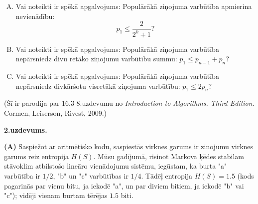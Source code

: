 \documentclass[a4paper]{article}
\begin{document}
\begin{enumerate}[(A)]
\item Vai noteikti ir spēkā apgalvojums: Populārākā ziņojuma varbūtība
apmierina nevienādību:
$${\displaystyle p_1 \leq \frac{2}{2^k + 1}}?$$
\item Vai noteikti ir spēkā apgalvojums: Populārākā ziņojuma varbūtība
nepārsniedz divu retāko ziņojumu varbūtību summu: $p_1 \leq p_{n-1} + p_{n}$?
\item Vai noteikti ir spēkā apgalvojums: Populārākā ziņojuma varbūtība
nepārsniedz divkāršotu visretākā ziņojuma varbūtību: $p_1 \leq 2p_n$?
\end{enumerate}

(Šī ir parodija par 16.3-8.uzdevumu no {\em Introduction to Algorithms. Third Edition.} Cormen, Leiserson, Rivest, 2009.)














\newpage

\vspace{10pt}
{\bf 2.uzdevums.}

{\bf (A)} Saspiežot ar aritmētisko kodu, saspiestās virknes garums ir  
ziņojumu virknes garums reiz entropija $H(S)$.
Mūsu gadījumā, risinot Markova ķēdes stabilam stāvoklim 
atbilstošo lineāro vienādojumu sistēmu, iegūstam, ka
burta "a" varbūtība ir $1/2$, "b" un "c" varbūtības ir $1/4$. 
Tādēļ entropija $H(S) = 1.5$ (kods pagarinās par vienu bitu, 
ja iekodē "a", un par diviem bitiem, ja iekodē "b" vai "c"); 
vidēji vienam burtam tērējas $1.5$ biti.
\end{document}
